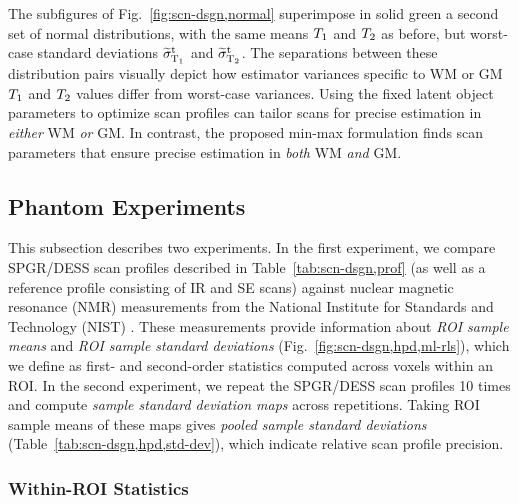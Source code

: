The subfigures of Fig.~\ref{fig:scn-dsgn,normal} superimpose 
in solid green a second set of normal distributions, 
with the same means $T_1$ and $T_2$ as before, 
but worst-case standard deviations $\widetilde{\sigma}_{\mathrm{T}_1}^\mathrm{t}$ and $\widetilde{\sigma}_{\mathrm{T}_2}^\mathrm{t}$. 
The separations between these distribution pairs 
visually depict how estimator variances specific 
to WM or GM $T_1$ and $T_2$ values differ 
from worst-case variances. 
Using the fixed latent object parameters 
to optimize scan profiles can tailor scans 
for precise estimation in \emph{either} WM \emph{or} GM. 
In contrast, the proposed min-max formulation finds scan parameters 
that ensure precise estimation 
in \emph{both} WM \emph{and} GM.	

\subsection{Phantom Experiments}
\label{ss,scn-dsgn,exp,phant}

This subsection describes two experiments. 
In the first experiment, 
we compare SPGR/DESS scan profiles 
described in Table~\ref{tab:scn-dsgn,prof} 
(as well as a reference profile consisting of IR and SE scans) 
against nuclear magnetic resonance (NMR) measurements 
from the National Institute for Standards and Technology (NIST) 
\cite{keenan:16:msm}.
These measurements provide information 
about \emph{ROI sample means} and \emph{ROI sample standard deviations} 
(Fig.~\ref{fig:scn-dsgn,hpd,ml-rls}), 
which we define as first- and second-order statistics 
computed across voxels within an ROI.
In the second experiment, 
we repeat the SPGR/DESS scan profiles 10 times 
and compute \emph{sample standard deviation maps} 
across repetitions. 
Taking ROI sample means of these maps 
gives \emph{pooled sample standard deviations} 
(Table~\ref{tab:scn-dsgn,hpd,std-dev}), 
which indicate relative scan profile precision.

\subsubsection{Within-ROI Statistics} 
\label{sss,scn-dsgn,exp,phant,roi}

